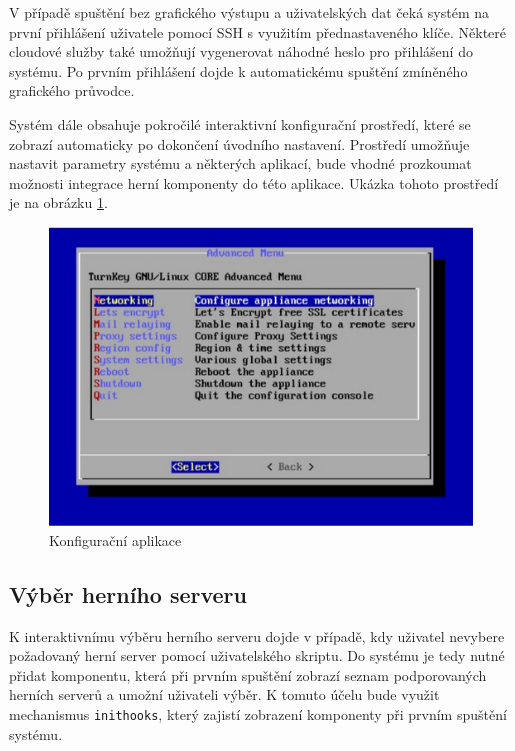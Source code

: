 V případě spuštění bez grafického výstupu a uživatelských dat čeká systém na první přihlášení uživatele pomocí SSH s využitím přednastaveného klíče.
Některé cloudové služby také umožňují vygenerovat náhodné heslo pro přihlášení do systému. Po prvním přihlášení dojde k automatickému spuštění zmíněného grafického průvodce.

Systém dále obsahuje pokročilé interaktivní konfigurační prostředí, které se zobrazí automaticky po dokončení úvodního nastavení.
Prostředí umožňuje nastavit parametry systému a některých aplikací, bude vhodné prozkoumat možnosti integrace herní komponenty do této aplikace.
Ukázka tohoto prostředí je na obrázku \ref{fig:confconsole}.

\begin{figure}[h]
    \centering
    \includegraphics[width=1\linewidth]{chapters/images/confconsole.pdf}
    \caption{Konfigurační aplikace \cite{turnkey}}
    \label{fig:confconsole}
\end{figure}

\subsection{Výběr herního serveru}

K interaktivnímu výběru herního serveru dojde v případě, kdy uživatel nevybere požadovaný herní server pomocí uživatelského skriptu.
Do systému je tedy nutné přidat komponentu, která při prvním spuštění zobrazí seznam podporovaných herních serverů a umožní uživateli výběr.
K tomuto účelu bude využit mechanismus \texttt{inithooks}, který zajistí zobrazení komponenty při prvním spuštění systému.

